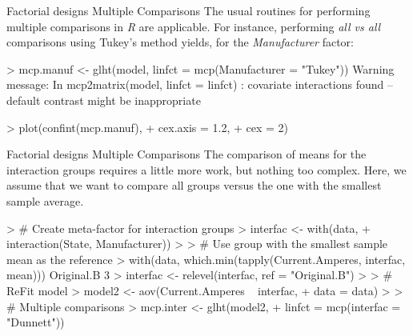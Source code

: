 \documentclass[t]{beamer}
\begin{document}

\begin{ftstf}
{Factorial designs}
{Multiple Comparisons}
The usual routines for performing multiple comparisons in \textit{R} are applicable. For instance, performing \textit{all vs all} comparisons using Tukey's method yields, for the \textit{Manufacturer} factor:
\vhalf
\begin{rcode}
> mcp.manuf <- glht(model, linfct = mcp(Manufacturer = "Tukey"))
Warning message:
In mcp2matrix(model, linfct = linfct) :
  covariate interactions found 
  -- default contrast might be inappropriate

> plot(confint(mcp.manuf),
+      cex.axis   = 1.2,
+      cex        = 2)
\end{rcode}
\end{ftstf}


\begin{ftstf}
{Factorial designs}
{Multiple Comparisons}
The comparison of means for the interaction groups requires a little more work, but nothing too complex. Here, we assume that we want to compare all groups versus the one with the smallest sample average.
\vhalf
\begin{rcode}
> # Create meta-factor for interaction groups
> interfac <- with(data, 
+                  interaction(State, Manufacturer))
> 
> # Use group with the smallest sample mean as the reference
> with(data, which.min(tapply(Current.Amperes, interfac, mean)))
Original.B 
         3 
> interfac <- relevel(interfac, ref = "Original.B")
> 
> # ReFit model
> model2 <- aov(Current.Amperes ~ interfac,
+               data = data)
> 
> # Multiple comparisons
> mcp.inter <- glht(model2,
+                 linfct = mcp(interfac = "Dunnett"))
\end{rcode}
\end{ftstf}
\end{document}
